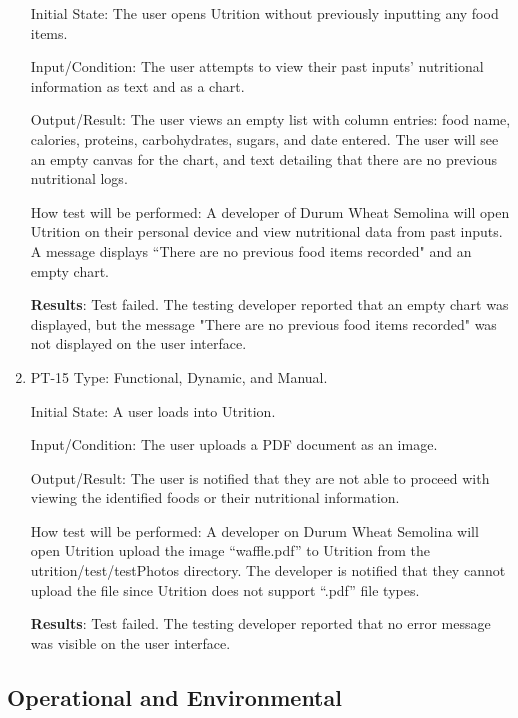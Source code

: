 \documentclass[12pt, titlepage]{article}
\begin{document}
\begin{enumerate}
		Initial State: The user opens Utrition without previously inputting any food items.
		
		Input/Condition: The user attempts to view their past inputs' nutritional information as text and as a chart.
		
		Output/Result: The user views an empty list with column entries: food name, calories, proteins, carbohydrates, sugars, and date entered. The user will see an empty canvas for the chart, and text detailing that there are no previous nutritional logs.
		
		How test will be performed: A developer of Durum Wheat Semolina will open Utrition on their personal device and view nutritional data from past inputs. A message displays “There are no previous food items recorded" and an empty chart.
		
		\textbf{Results}: Test failed. The testing developer reported that an empty chart was displayed, but the message "There are no previous food items recorded" was not displayed on the user interface.
		
		\item{PT-15}
		Type: Functional, Dynamic, and Manual.
		
		Initial State: A user loads into Utrition.
		
		Input/Condition: The user uploads a PDF document as an image.
		
		Output/Result: The user is notified that they are not able to proceed with viewing the identified foods or their nutritional information.
		
		How test will be performed: A developer on Durum Wheat Semolina will open Utrition upload the image “waffle.pdf” to Utrition from the utrition/test/testPhotos directory. The developer is notified that they cannot upload the file since Utrition does not support “.pdf” file types.
		
		\textbf{Results}: Test failed. The testing developer reported that no error message was visible on the user interface.
		
	\end{enumerate}
	
	\subsection{Operational and Environmental}
	
\end{document}
